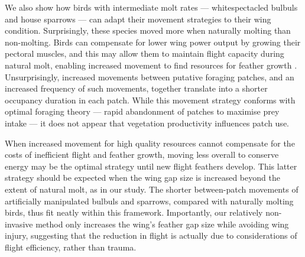 \begin{refsection}
We also show how birds with intermediate molt rates --- whitespectacled bulbuls and house sparrows --- can adapt their movement strategies to their wing condition.
Surprisingly, these species moved more when naturally molting than non-molting.
Birds can compensate for lower wing power output by growing their pectoral muscles, and this may allow them to maintain flight capacity during natural molt, enabling increased movement to find resources for feather growth \cite{chai1997,swaddle1997}.
Unsurprisingly, increased movements between putative foraging patches, and an increased frequency of such movements, together translate into a shorter occupancy duration in each patch.
While this movement strategy conforms with optimal foraging theory --- rapid abandonment of patches to maximise prey intake \cite{charnov1976} --- it does not appear that vegetation productivity influences patch use.

When increased movement for high quality resources \cite{charnov1976} cannot compensate for the costs of inefficient flight and feather growth, moving less overall to conserve energy may be the optimal strategy until new flight feathers develop.
This latter strategy should be expected when the wing gap size is increased beyond the extent of natural molt, as in our study.
The shorter between-patch movements of artificially manipulated bulbuls and sparrows, compared with naturally molting birds, thus fit neatly within this framework.
Importantly, our relatively non-invasive method only increases the wing's feather gap size while avoiding wing injury, suggesting that the reduction in flight is actually due to considerations of flight efficiency, rather than trauma.


\end{refsection}
